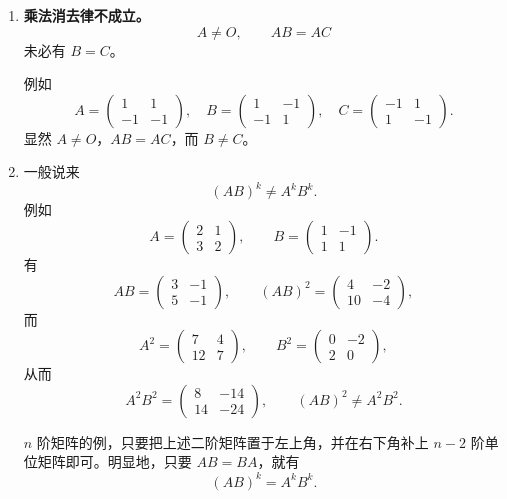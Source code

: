\begin{enumerate}
\item \textbf{乘法消去律不成立。}
\[
 A\ne O,\qquad AB=AC
\]
未必有 $B=C$。

例如
\[
 A=\begin{pmatrix}1&1\\-1&-1\end{pmatrix},\quad
 B=\begin{pmatrix}1&-1\\-1&1\end{pmatrix},\quad
 C=\begin{pmatrix}-1&1\\1&-1\end{pmatrix}.
\]
显然 $A\ne O$，$AB=AC$，而 $B\ne C$。

\item 一般说来
\[
 (AB)^k\ne A^kB^k.
\]
例如
\[
 A=\begin{pmatrix}2&1\\3&2\end{pmatrix},\qquad
 B=\begin{pmatrix}1&-1\\1&1\end{pmatrix}.
\]
有
\[
 AB=\begin{pmatrix}3&-1\\5&-1\end{pmatrix},
\qquad
 (AB)^2=\begin{pmatrix}4&-2\\10&-4\end{pmatrix},
\]
而
\[
 A^2=\begin{pmatrix}7&4\\12&7\end{pmatrix},
\qquad
 B^2=\begin{pmatrix}0&-2\\2&0\end{pmatrix},
\]
从而
\[
 A^2B^2=\begin{pmatrix}8&-14\\14&-24\end{pmatrix},
\qquad
 (AB)^2\ne A^2B^2.
\]

$n$ 阶矩阵的例，只要把上述二阶矩阵置于左上角，并在右下角补上 $n-2$ 阶单位矩阵即可。明显地，只要 $AB=BA$，就有
\[
 (AB)^k=A^kB^k.
\]


\end{enumerate}
